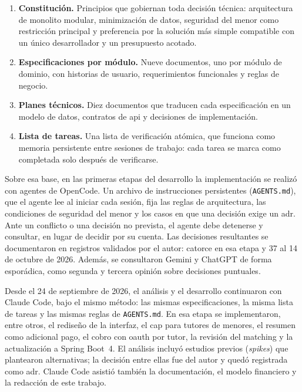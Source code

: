 \begin{enumerate}
    \item \textbf{Constitución.} Principios que gobiernan toda decisión
          técnica: arquitectura de monolito modular, minimización de
          datos, seguridad del menor como restricción principal y
          preferencia por la solución más simple compatible con un único
          desarrollador y un presupuesto acotado.
    \item \textbf{Especificaciones por módulo.} Nueve documentos, uno por
          módulo de dominio, con historias de usuario, requerimientos
          funcionales y reglas de negocio.
    \item \textbf{Planes técnicos.} Diez documentos que traducen cada
          especificación en un modelo de datos, contratos de \gls{api} y
          decisiones de implementación.
    \item \textbf{Lista de tareas.} Una lista de verificación atómica,
          que funciona como memoria persistente entre sesiones de trabajo:
          cada tarea se marca como completada solo después de verificarse.
\end{enumerate}

Sobre esa base, en las primeras etapas del desarrollo la implementación
se realizó con agentes de OpenCode. Un archivo de instrucciones
persistentes (\texttt{AGENTS.md}), que el agente lee al iniciar cada
sesión, fija las reglas de arquitectura, las condiciones de seguridad
del menor y los casos en que una decisión exige un \gls{adr}. Ante un conflicto o una decisión no
prevista, el agente debe detenerse y consultar, en lugar de decidir por
su cuenta. Las decisiones resultantes se documentaron en registros
validados por el autor: catorce en esa etapa y 37 al 14 de octubre de
2026. Además, se consultaron Gemini y ChatGPT de forma esporádica, como
segunda y tercera opinión sobre decisiones puntuales.

Desde el 24 de septiembre de 2026, el análisis y el desarrollo
continuaron con Claude Code, bajo el mismo método: las mismas
especificaciones, la misma lista de tareas y las mismas reglas de
\texttt{AGENTS.md}. En esa etapa se implementaron, entre otros, el
rediseño de la interfaz, el \gls{cap} para tutores de menores, el
resumen como adicional pago, el cobro con \gls{oauth} por tutor, la
revisión del \gls{matching} y la actualización a Spring Boot~4. El
análisis incluyó estudios previos (\emph{spikes}) que plantearon
alternativas; la decisión entre ellas fue del autor y quedó registrada
como \gls{adr}. Claude Code asistió también la documentación, el modelo
financiero y la redacción de este trabajo.


